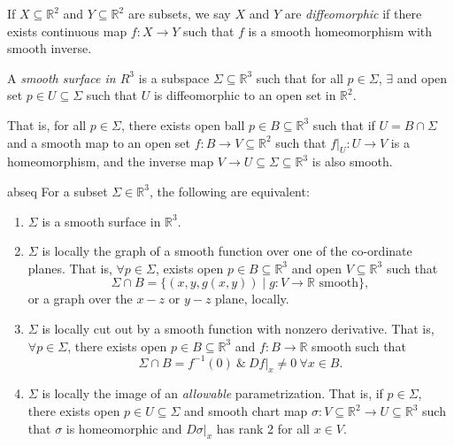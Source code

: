 \begin{definition}{}{}
    If \(X \subseteq \mathbb{R}^2\) and \(Y \subseteq \mathbb{R}^2\) are subsets, we say \(X\) and \(Y\) are \textit{diffeomorphic} if there exists continuous map \(f: X \to Y\) such that \(f\) is a smooth homeomorphism with smooth inverse.
\end{definition}
\begin{definition}{}{}
    A \textit{smooth surface in \(R^3\)} is a subspace \(\Sigma\subseteq \mathbb{R}^3\) such that for all \(p \in \Sigma\), \(\exists\) and open set \(p \in U \subseteq \Sigma\) such that \(U\) is diffeomorphic to an open set in \(\mathbb{R}^2\).

    That is, for all \(p \in \Sigma\), there exists open ball \(p \in B \subseteq \mathbb{R}^3\) such that if \(U = B \cap \Sigma\) and a smooth map to an open set \(f: B\to V \subseteq \mathbb{R}^2\) such that \(\left. f\right|_{U}:U\to V\) is a homeomorphism, and the inverse map \(V \to U \subseteq \Sigma \subseteq \mathbb{R}^3\) is also smooth.
\end{definition}
\begin{theorem}{}{abseq}
    For a subset \(\Sigma\in \mathbb{R}^3\), the following are equivalent:
    \begin{enumerate}
        \item \(\Sigma\) is a smooth surface in \(\mathbb{R}^3\).
        \item \(\Sigma\) is locally the graph of a smooth function over one of the co-ordinate planes. That is, \(\forall p \in \Sigma\), exists open \(p \in B \subseteq \mathbb{R}^3\) and open \(V \subseteq \mathbb{R}^3\) such that
        \[
            \Sigma \cap B = \{(x,y,g(x,y))\mid g:V \to \mathbb{R} \text{ smooth}\},
        \]
        or a graph over the \(x-z\) or \(y-z\) plane, locally.
        \item \(\Sigma\) is locally cut out by a smooth function with nonzero derivative. That is, \(\forall p \in \Sigma\), there exists open \(p \in B \subseteq \mathbb{R}^3\) and \(f: B \to \mathbb{R}\) smooth such that
        \[
            \Sigma \cap B = f^{-1}(0)~\&~\left. Df\right|_x \neq 0~\forall x \in B.
        \]
        \item \(\Sigma\) is locally the image of an \textit{allowable} parametrization. That is, if \(p \in \Sigma\), there exists open \(p \in U \subseteq \Sigma\) and smooth chart map \(\sigma: V\subseteq \mathbb{R}^2 \to U\subseteq\mathbb{R}^3\) such that \(\sigma\) is homeomorphic and \(\left.D\sigma \right|_x\) has rank 2 for all \(x \in V\).
    \end{enumerate} 
\end{theorem}
